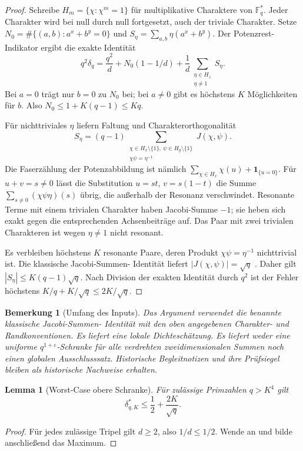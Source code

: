 \documentclass[11pt,a4paper]{article}
\newtheorem{lemma}[theorem]{Lemma}
\newtheorem{remark}[theorem]{Bemerkung}
\begin{document}
\begin{proof}
Schreibe $H_m=\{\chi:\chi^m=1\}$ für multiplikative Charaktere von
$\mathbb F_q^*$. Jeder Charakter wird bei null durch null fortgesetzt,
auch der triviale Charakter. Setze $N_0=\#\{(a,b):a^x+b^y=0\}$
und $S_\eta=\sum_{a,b}\eta(a^x+b^y)$. Der Potenzrest-Indikator ergibt
die exakte Identität
\[
 q^2\delta_q=\frac{q^2}{d}
       +N_0(1-1/d)+\frac1d\sum_{\substack{\eta\in H_z\\\eta\ne1}}S_\eta.
\]
Bei $a=0$ trägt nur $b=0$ zu $N_0$ bei; bei $a\ne0$ gibt es
höchstens $K$ Möglichkeiten für $b$. Also $N_0\le1+K(q-1)\le Kq$.

Für nichttriviales $\eta$ liefern Faltung und Charakterorthogonalität
\[
 S_\eta=(q-1)
 \sum_{\substack{\chi\in H_x\setminus\{1\},\
                 \psi\in H_y\setminus\{1\}\\
                 \chi\psi=\eta^{-1}}}J(\chi,\psi).
\]
Die Faserzählung der Potenzabbildung ist nämlich
$\sum_{\chi\in H_x}\chi(u)+\mathbf1_{\{u=0\}}$.
Für $u+v=s\ne0$ lässt die Substitution $u=st$, $v=s(1-t)$
die Summe $\sum_{s\ne0}(\chi\psi\eta)(s)$ übrig, die außerhalb
der Resonanz verschwindet. Resonante Terme mit einem trivialen
Charakter haben Jacobi-Summe $-1$; sie heben sich exakt gegen die
entsprechenden Achsenbeiträge auf. Das Paar mit zwei trivialen
Charakteren ist wegen $\eta\ne1$ nicht resonant.

Es verbleiben höchstens $K$ resonante Paare, deren Produkt
$\chi\psi=\eta^{-1}$ nichttrivial ist. Die klassische Jacobi-Summen-
Identität liefert $|J(\chi,\psi)|=\sqrt q$
\cite[Kap.~8]{IrelandRosen}. Daher gilt
$|S_\eta|\le K(q-1)\sqrt q$. Nach Division der exakten Identität
durch $q^2$ ist der Fehler höchstens
$K/q+K/\sqrt q\le2K/\sqrt q$.
\end{proof}

\begin{remark}[Umfang des Inputs]
Das Argument verwendet die benannte klassische Jacobi-Summen-
Identität mit den oben angegebenen Charakter- und Randkonventionen.
Es liefert eine lokale Dichteschätzung. Es liefert weder eine uniforme
$q^{1+\varepsilon}$-Schranke für alle verdrehten zweidimensionalen
Summen noch einen globalen Ausschlusssatz. Historische Begleitnotizen
und ihre Prüfsiegel bleiben als historische Nachweise erhalten.
\end{remark}

\begin{lemma}[Worst-Case obere Schranke]
\label{lem:worstcase}
Für zulässige Primzahlen $q>K^4$ gilt
\[
 \delta_{q,K}^{*}\le\frac12+\frac{2K}{\sqrt q}.
\]
\end{lemma}
\begin{proof}
Für jedes zulässige Tripel gilt $d\ge2$, also $1/d\le1/2$.
Wende  an und bilde anschließend das Maximum.
\end{proof}
\end{document}
